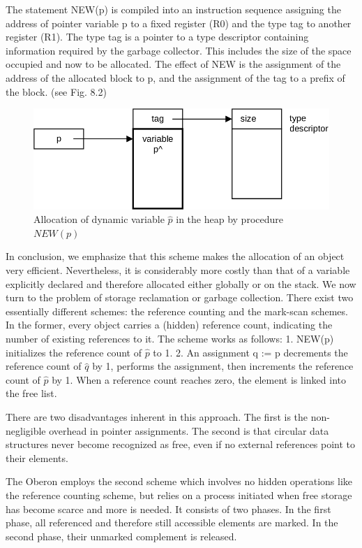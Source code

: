 The statement NEW(p) is compiled into an instruction sequence assigning the address of pointer
variable p to a fixed register (R0) and the type tag to another register (R1). The type tag is a pointer
to a type descriptor containing information required by the garbage collector. This includes the size
of the space occupied and now to be allocated. The effect of NEW is the assignment of the address
of the allocated block to p, and the assignment of the tag to a prefix of the block. (see Fig. 8.2)
\begin{figure}
	\label{fig:allocation}
	\centering
	\includegraphics[width=\textwidth]{i/r}
	\caption{Allocation of dynamic variable $\hat{p}$ in the heap by procedure $NEW(p)$}
\end{figure}
In conclusion, we emphasize that this scheme makes the allocation of an object very efficient.
Nevertheless, it is considerably more costly than that of a variable explicitly declared and therefore
allocated either globally or on the stack.
We now turn to the problem of storage reclamation or garbage collection. There exist two
essentially different schemes: the reference counting and the mark-scan schemes. In the former,
every object carries a (hidden) reference count, indicating the number of existing references to it.
The scheme works as follows:
1. NEW(p) initializes the reference count of $\hat{p}$ to 1.
2. An assignment q := p decrements the reference count of $\hat{q}$ by 1, performs the assignment,
then increments the reference count of $\hat{p}$ by 1. When a reference count reaches zero, the
element is linked into the free list.

There are two disadvantages inherent in this approach. The first is the non-negligible overhead in
pointer assignments. The second is that circular data structures never become recognized as free,
even if no external references point to their elements.

The Oberon employs the second scheme which involves no hidden operations like the
reference counting scheme, but relies on a process initiated when free storage has become scarce
and more is needed. It consists of two phases. In the first phase, all referenced and therefore still
accessible elements are marked. In the second phase, their unmarked complement is released.

